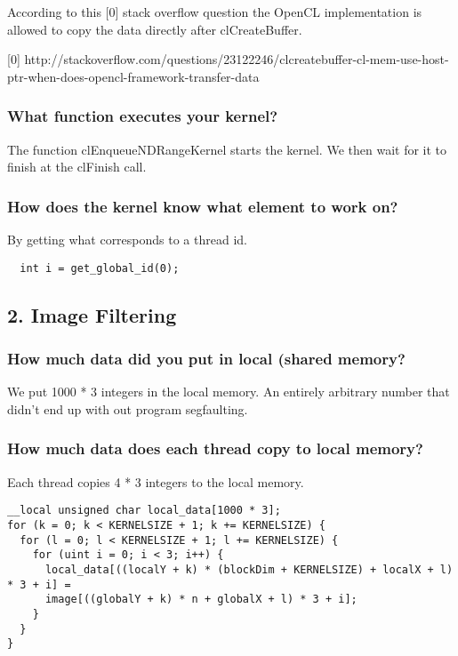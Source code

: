 \documentclass[a4paper,12pt]{article}
\begin{document}
According to this [0] stack overflow question the OpenCL implementation is allowed to copy the data directly after clCreateBuffer.

[0] http://stackoverflow.com/questions/23122246/clcreatebuffer-cl-mem-use-host-ptr-when-does-opencl-framework-transfer-data


\subsubsection{What function executes your kernel?}

The function clEnqueueNDRangeKernel starts the kernel. We then wait for it to finish at the clFinish call.


\subsubsection{How does the kernel know what element to work on?}

By getting what corresponds to a thread id.

\begin{lstlisting}
  int i = get_global_id(0);
\end{lstlisting}



\subsection{2. Image Filtering}

\subsubsection{How much data did you put in local (shared memory?}

We put 1000 * 3 integers in the local memory. An entirely arbitrary number that didn't end up with out program segfaulting.


\subsubsection{How much data does each thread copy to local memory?}

Each thread copies 4 * 3 integers to the local memory.

\begin{lstlisting}[float,label=lst:caching,caption=nextHopInfo: Caching data in local/shared memory.]
__local unsigned char local_data[1000 * 3];
for (k = 0; k < KERNELSIZE + 1; k += KERNELSIZE) {
  for (l = 0; l < KERNELSIZE + 1; l += KERNELSIZE) {
    for (uint i = 0; i < 3; i++) {
      local_data[((localY + k) * (blockDim + KERNELSIZE) + localX + l) * 3 + i] =
      image[((globalY + k) * n + globalX + l) * 3 + i];
    }
  }
}
\end{lstlisting}
\end{document}
